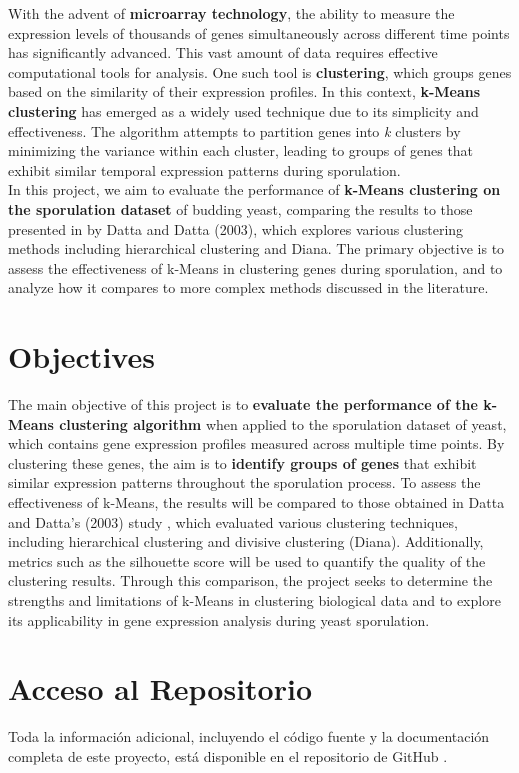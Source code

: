 \documentclass{article}
\begin{document}
With the advent of \textbf{microarray technology}, the ability to measure the expression levels of thousands of genes simultaneously across different time points has significantly advanced. This vast amount of data requires effective computational tools for analysis. One such tool is \textbf{clustering}, which groups genes based on the similarity of their expression profiles. In this context, \textbf{k-Means clustering} has emerged as a widely used technique due to its simplicity and effectiveness. The algorithm attempts to partition genes into
\emph{k} clusters by minimizing the variance within each cluster, leading to groups of genes that exhibit similar temporal expression patterns during sporulation.
\\

In this project, we aim to evaluate the performance of \textbf{k-Means clustering on the sporulation dataset} of budding yeast, comparing the results to those presented in \cite{datta2003comparison} by Datta and Datta (2003), which explores various clustering methods including hierarchical clustering and Diana. The primary objective is to assess the effectiveness of k-Means in clustering genes during sporulation, and to analyze how it compares to more complex methods discussed in the literature.

\section{Objectives}
The main objective of this project is to \textbf{evaluate the performance of the k-Means clustering algorithm} when applied to the sporulation dataset of yeast, which contains gene expression profiles measured across multiple time points. By clustering these genes, the aim is to \textbf{identify groups of genes} that exhibit similar expression patterns throughout the sporulation process. To assess the effectiveness of k-Means, the results will be compared to those obtained in Datta and Datta's (2003) study \cite{datta2003comparison}, which evaluated various clustering techniques, including hierarchical clustering and divisive clustering (Diana). Additionally, metrics such as the silhouette score will be used to quantify the quality of the clustering results. Through this comparison, the project seeks to determine the strengths and limitations of k-Means in clustering biological data and to explore its applicability in gene expression analysis during yeast sporulation.
	
\newpage
\section{Acceso al Repositorio}

Toda la información adicional, incluyendo el código fuente y la documentación completa de este proyecto, está disponible en el repositorio de GitHub \cite{silva2024github}.

\end{document}
